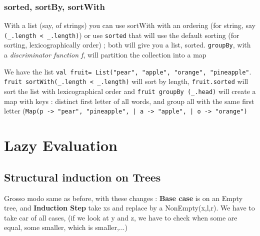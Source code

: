 \documentclass[12pt,a4paper]{article}
\begin{document}
\subsubsection{sorted, sortBy, sortWith}
With a list (say, of strings) you can use sortWith with an ordering (for string, say \texttt{(\_.length < \_.length)}) or use \texttt{sorted} that will use the default sorting (for sorting, lexicographically order) ; both will give you a list, sorted. \texttt{groupBy}, with a \textit{discriminator function f}, will partition the collection into a map 
\begin{exemple}
	We have the list \texttt{val fruit= List("pear", "apple", "orange", "pineapple"}. \texttt{fruit sortWith(\_.length < \_.length)} will sort by length, \texttt{fruit.sorted} will sort the list with lexicographical order and \texttt{fruit groupBy (\_.head)} will create a map with keys : distinct first letter of all words, and group all with the same first letter (\texttt{Map(p -> "pear", "pineapple", | a -> "apple", | o -> "orange")}
\end{exemple}


\section{Lazy Evaluation}
\subsection{Structural induction on Trees}
Grosso modo same as before, with these changes : \textbf{Base case} is on an Empty tree, and \textbf{Induction Step} take xs and replace by a NonEmpty(x,l,r). We have to take car of all cases, (if we look at y and z, we have to check when some are equal, some smaller, which is smaller,...)
\end{document}
